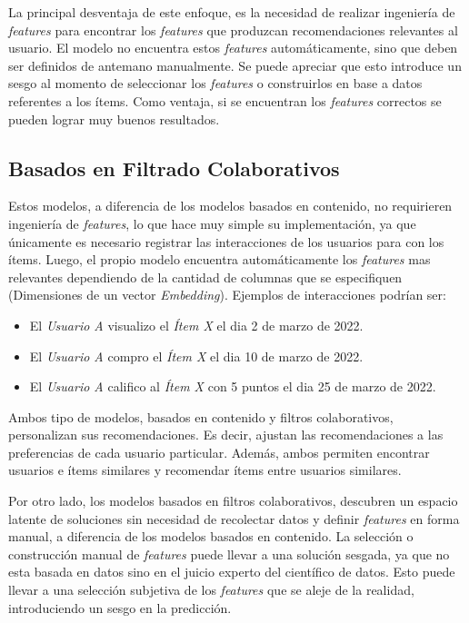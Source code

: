 \documentclass[11pt,a4paper,twoside]{thesis}
\begin{document}
La principal desventaja de este enfoque, es la necesidad de realizar ingeniería
de \textit{features} para encontrar los \textit{features} que produzcan
recomendaciones relevantes al usuario. El modelo no encuentra estos
\textit{features} automáticamente, sino que deben ser definidos de antemano
manualmente. Se puede apreciar que esto introduce un sesgo al momento de
seleccionar los \textit{features} o construirlos en base a datos referentes a
los ítems. Como ventaja, si se encuentran los \textit{features} correctos se
pueden lograr muy buenos resultados.

\subsection{Basados en Filtrado Colaborativos}

Estos modelos, a diferencia de los modelos basados en contenido, no requirieren
ingeniería de \textit{features}, lo que hace muy simple su implementación, ya
que únicamente es necesario registrar las interacciones de los usuarios para
con los ítems. Luego, el propio modelo encuentra automáticamente los
\textit{features} mas relevantes dependiendo de la cantidad de columnas que se
especifiquen (Dimensiones de un vector \textit{Embedding}). Ejemplos de
interacciones podrían ser:

\begin{itemize}
	\item El \textit{Usuario A} visualizo el \textit{Ítem X} el dia 2 de marzo de 2022.
	\item El \textit{Usuario A} compro el \textit{Ítem X} el dia 10 de marzo de 2022.
	\item El \textit{Usuario A} califico al \textit{Ítem X} con 5 puntos el dia 25 de
	      marzo de 2022.
\end{itemize}

Ambos tipo de modelos, basados en contenido y filtros colaborativos,
personalizan sus recomendaciones. Es decir, ajustan las recomendaciones a las
preferencias de cada usuario particular. Además, ambos permiten encontrar
usuarios e ítems similares y recomendar ítems entre usuarios similares.

Por otro lado, los modelos basados en filtros colaborativos, descubren un
espacio latente de soluciones sin necesidad de recolectar datos y definir
\textit{features} en forma manual, a diferencia de los modelos basados en
contenido. La selección o construcción manual de \textit{features} puede llevar
a una solución sesgada, ya que no esta basada en datos sino en el juicio
experto del científico de datos. Esto puede llevar a una selección subjetiva de
los \textit{features} que se aleje de la realidad, introduciendo un sesgo en la
predicción.
\end{document}
